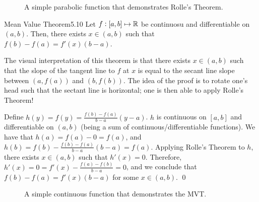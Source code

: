 \begin{figure}[htbp]
    \centering
    
    \caption{A simple parabolic function that demonstrates Rolle's Theorem.}
    \label{fig21}
\end{figure}

\newpage 
\setcounter{rudin}{9}
\begin{theorem}{Mean Value Theorem}{5.10}
    Let $f: [a, b] \mapsto \mathbb{R}$ be continuosu and differentiable on $(a, b)$. Then, there exists $x \in (a, b)$ such that $f(b) - f(a) = f'(x)(b - a)$.
\end{theorem}
\noindent The visual interpretation of this theorem is that there exists $x \in (a, b)$ such that the slope of the tangent line to $f$ at $x$ is equal to the secant line slope between $(a, f(a))$ and $(b, f(b))$. The idea of the proof is to rotate one's head such that the sectant line is horizontal; one is then able to apply Rolle's Theorem!

\begin{nproof}
    Define $h(y) = f(y) = \frac{f(b) - f(a)}{b - a}(y - a)$. $h$ is continuous on $[a, b]$ and differentiable on $(a, b)$ (being a sum of continuous/differentiable functions). We have that $h(a) = f(a) - 0 = f(a)$, and $h(b) = f(b) - \frac{f(b) - f(a)}{b - a}(b - a) = f(a)$. Applying Rolle's Theorem to $h$, there exists $x \in (a, b)$ such that $h'(x) = 0$. Therefore, $h'(x) = 0 = f'(x) - \frac{f(a) - f(b)}{b - a} = 0$, and we conclude that $f(b) - f(a) = f'(x)(b - a)$ for some $x \in (a, b)$. \qed
\end{nproof}

\begin{figure}[htbp]
    \centering
    \caption{A simple continuous function that demonstrates the MVT.}
    \label{fig22}
\end{figure}


